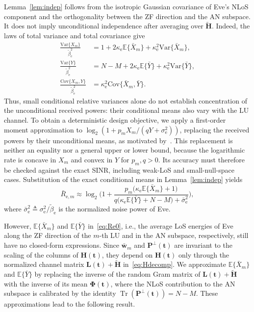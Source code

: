 \documentclass[journal]{IEEEtran}
\newcommand{\E}{\mathbb{E}}
\newcommand{\tr}{\operatorname{Tr}}
\newcommand{\bt}{\mathbf{t}}
\newcommand{\bH}{\mathbf{H}}
\newcommand{\Htl}{\tilde{\mathbf{H}}}
\newcommand{\bL}{\mathbf{L}}
\newcommand{\wb}{\bar{\mathbf{w}}}
\newcommand{\bPhi}{\boldsymbol{\Phi}}
\newcommand{\sbe}{\bar{\sigma}_{\mathrm{e}}^2}
\newcommand{\PHp}{\mathbf{P}^{\perp}(\bt)}
\begin{document}
Lemma~\ref{lem:indep} follows from the isotropic Gaussian covariance of Eve's NLoS component and the orthogonality between the ZF direction and the AN subspace. It does not imply unconditional independence after averaging over $\Htl$. Indeed, the laws of total variance and total covariance give
\begin{align}
\frac{\mathrm{Var}\{X_m\}}{\tilde\beta_{\mathrm{e}}^2}
&=1+2\kappa_{\mathrm{e}}\E\{\bar X_m\}
  +\kappa_{\mathrm{e}}^2\mathrm{Var}\{\bar X_m\},\nonumber\\
\frac{\mathrm{Var}\{Y\}}{\tilde\beta_{\mathrm{e}}^2}
&=N-M+2\kappa_{\mathrm{e}}\E\{\bar Y\}
  +\kappa_{\mathrm{e}}^2\mathrm{Var}\{\bar Y\},\nonumber\\
\frac{\mathrm{Cov}\{X_m,Y\}}{\tilde\beta_{\mathrm{e}}^2}
&=\kappa_{\mathrm{e}}^2\mathrm{Cov}\{\bar X_m,\bar Y\}.
\label{eq:unconditional_moments}
\end{align}
Thus, small conditional relative variances alone do not establish concentration of the unconditional received powers: their conditional means also vary with the LU channel. To obtain a deterministic design objective, we apply a first-order moment approximation to $\log_2(1+p_mX_m/(qY+\sigma_{\mathrm{e}}^2))$, replacing the received powers by their unconditional means, as motivated by~\cite[Lemma~1]{ZhangJSTSP2014}. This replacement is neither an equality nor a general upper or lower bound, because the logarithmic rate is concave in $X_m$ and convex in $Y$ for $p_m,q>0$. Its accuracy must therefore be checked against the exact SINR, including weak-LoS and small-null-space cases. Substitution of the exact conditional means in Lemma~\ref{lem:indep} yields
\begin{equation}\label{eq:Re0}
\bar R_{\mathrm{e},m}\approx\log_2\bigg(1+\frac{p_m\big(\kappa_{\mathrm{e}}\E\{\bar X_m\}+1\big)}{q\big(\kappa_{\mathrm{e}}\E\{\bar Y\}+N-M\big)+\sbe}\bigg),
\end{equation}
where $\sbe\triangleq\sigma_{\mathrm{e}}^2/\tilde\beta_{\mathrm{e}}$ is the normalized noise power of Eve.

However, $\E\{\bar X_m\}$ and $\E\{\bar Y\}$ in~\eqref{eq:Re0}, i.e., the average LoS energies of Eve along the ZF direction of the $m$-th LU and in the AN subspace, respectively, still have no closed-form expressions. Since $\wb_m$ and $\PHp$ are invariant to the scaling of the columns of $\bH(\bt)$, they depend on $\bH(\bt)$ only through the normalized channel matrix $\bL(\bt)+\Htl$ in~\eqref{eq:Hdecomp}. We approximate $\E\{\bar X_m\}$ and $\E\{\bar Y\}$ by replacing the inverse of the random Gram matrix of $\bL(\bt)+\Htl$ with the inverse of its mean $\bPhi(\bt)$, where the NLoS contribution to the AN subspace is calibrated by the identity $\tr(\PHp)=N-M$. These approximations lead to the following result.
\end{document}
